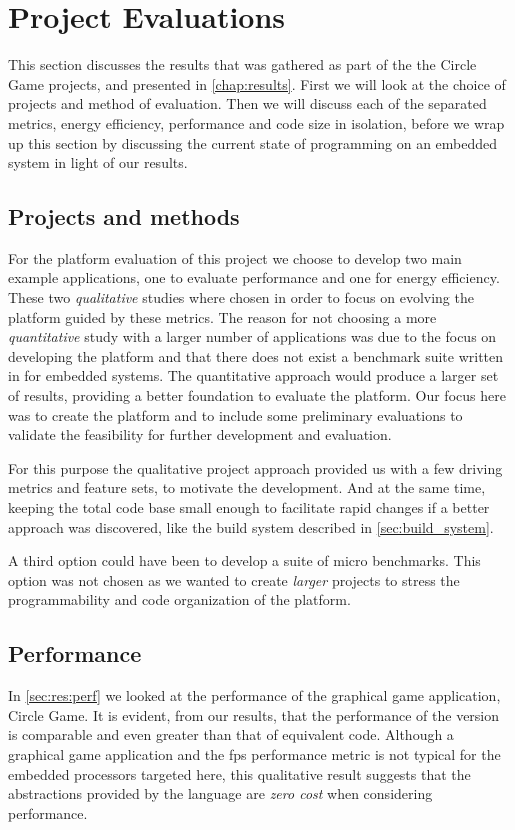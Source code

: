 
\section{Project Evaluations}
\label{sec:disc:project_evaluations}

This section discusses the results that was gathered as part of the {\tracker} the Circle Game projects, and presented in \autoref{chap:results}.
First we will look at the choice of projects and method of evaluation.
Then we will discuss each of the separated metrics, energy efficiency, performance and code size in isolation, before we wrap up this section by discussing the current state of {\rust} programming on an embedded system in light of our results.

\subsection{Projects and methods}

For the platform evaluation of this project we choose to develop two main example applications, one to evaluate performance and one for energy efficiency.
These two \emph{qualitative} studies where chosen in order to focus on evolving the platform guided by these metrics.
The reason for not choosing a more \emph{quantitative} study with a larger number of applications was due to the focus on developing the platform and that there does not exist a benchmark suite written in {\rust} for embedded systems.
The quantitative approach would produce a larger set of results, providing a better foundation to evaluate the platform.
Our focus here was to create the platform and to include some preliminary evaluations to validate the feasibility for further development and evaluation.

For this purpose the qualitative project approach provided us with a few driving metrics and feature sets, to motivate the development.
And at the same time, keeping the total code base small enough to facilitate rapid changes if a better approach was discovered, like the build system described in \autoref{sec:build_system}.

A third option could have been to develop a suite of micro benchmarks.
This option was not chosen as we wanted to create \emph{larger} projects to stress the programmability and code organization of the platform.

\subsection{Performance}
In \autoref{sec:res:perf} we looked at the performance of the graphical game application, Circle Game.
It is evident, from our results, that the performance of the {\rust} version is comparable and even greater than that of equivalent {\C} code.
Although a graphical game application and the \gls{fps} performance metric is not typical for the embedded processors targeted here, this qualitative result suggests that the abstractions provided by the {\rust} language are \emph{zero cost} when considering performance.

